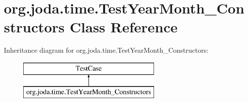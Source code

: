 \hypertarget{classorg_1_1joda_1_1time_1_1_test_year_month___constructors}{\section{org.\-joda.\-time.\-Test\-Year\-Month\-\_\-\-Constructors Class Reference}
\label{classorg_1_1joda_1_1time_1_1_test_year_month___constructors}
}
Inheritance diagram for org.\-joda.\-time.\-Test\-Year\-Month\-\_\-\-Constructors\-:\begin{figure}[H]
\begin{center}
\leavevmode
\includegraphics[height=2.000000cm]{classorg_1_1joda_1_1time_1_1_test_year_month___constructors}
\end{center}
\end{figure}
